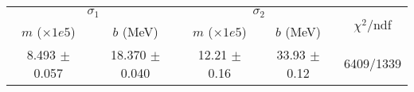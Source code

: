 \begin{tabular}{cc|cc||c}
\multicolumn{2}{c|}{$\sigma_1$} & \multicolumn{2}{|c}{$\sigma_2$} & \multirow{2}{*}{$\chi^2/$ndf} \\
$m$ ($\times1e5$) & $b$ (MeV) & $m$ ($\times1e5$) & $b$ (MeV) & \\
\hline
8.493 $\pm$ 0.057 & 18.370 $\pm$ 0.040 & 12.21 $\pm$ 0.16 & 33.93 $\pm$ 0.12 & 6409/1339\\
\end{tabular}
